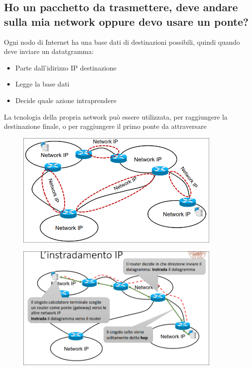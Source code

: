 \documentclass{report}
\begin{document}
                \subsection{Ho un pacchetto da trasmettere, deve andare sulla mia network oppure devo usare un ponte?}
                    Ogni nodo di Internet ha una base dati di destinazioni possibili, quindi quando deve inviare un datatgramma:
                    \begin{itemize}
                        \item Parte dall'idirizzo IP destinazione
                        \item Legge la base dati 
                        \item Decide quale azione intraprendere
                    \end{itemize}
                    La tcnologia della propria network può essere utilizzata, per raggiungere la destinazione finale, o per raggiungere il primo ponte da attraversare
                    \begin{figure}[H]
                        \includegraphics[width=0.9\textwidth]{1/ip.png}
                    \end{figure} 
                    \begin{figure}[H]
                        \includegraphics[width=0.9\textwidth]{1/ip2.png}
                    \end{figure}
\end{document}
